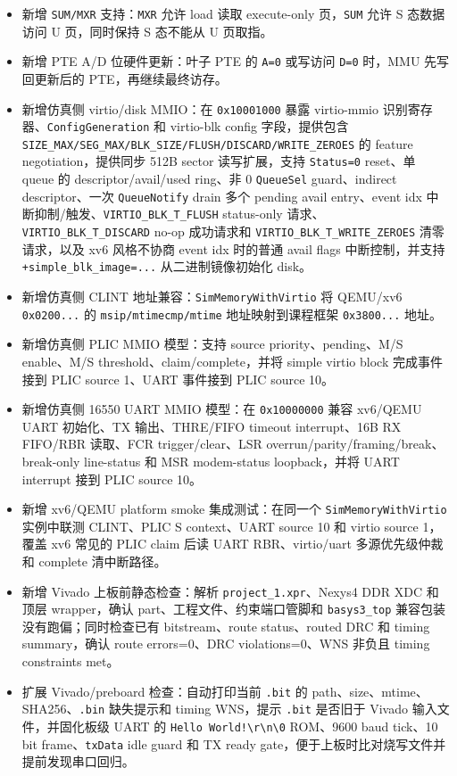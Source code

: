\documentclass[UTF8,a4paper,11pt]{ctexart}
\begin{document}
\begin{itemize}
  \item 新增 \texttt{SUM/MXR} 支持：\texttt{MXR} 允许 load 读取 execute-only 页，\texttt{SUM} 允许 S 态数据访问 U 页，同时保持 S 态不能从 U 页取指。
  \item 新增 PTE A/D 位硬件更新：叶子 PTE 的 \texttt{A=0} 或写访问 \texttt{D=0} 时，MMU 先写回更新后的 PTE，再继续最终访存。
  \item 新增仿真侧 virtio/disk MMIO：在 \texttt{0x10001000} 暴露 virtio-mmio 识别寄存器、\texttt{ConfigGeneration} 和 virtio-blk config 字段，提供包含 \texttt{SIZE\_MAX/SEG\_MAX/BLK\_SIZE/FLUSH/DISCARD/WRITE\_ZEROES} 的 feature negotiation，提供同步 512B sector 读写扩展，支持 \texttt{Status=0} reset、单 queue 的 descriptor/avail/used ring、非 0 \texttt{QueueSel} guard、indirect descriptor、一次 \texttt{QueueNotify} drain 多个 pending avail entry、event idx 中断抑制/触发、\texttt{VIRTIO\_BLK\_T\_FLUSH} status-only 请求、\texttt{VIRTIO\_BLK\_T\_DISCARD} no-op 成功请求和 \texttt{VIRTIO\_BLK\_T\_WRITE\_ZEROES} 清零请求，以及 xv6 风格不协商 event idx 时的普通 avail flags 中断控制，并支持 \texttt{+simple\_blk\_image=...} 从二进制镜像初始化 disk。
  \item 新增仿真侧 CLINT 地址兼容：\texttt{SimMemoryWithVirtio} 将 QEMU/xv6 \texttt{0x0200...} 的 \texttt{msip/mtimecmp/mtime} 地址映射到课程框架 \texttt{0x3800...} 地址。
  \item 新增仿真侧 PLIC MMIO 模型：支持 source priority、pending、M/S enable、M/S threshold、claim/complete，并将 simple virtio block 完成事件接到 PLIC source 1、UART 事件接到 PLIC source 10。
  \item 新增仿真侧 16550 UART MMIO 模型：在 \texttt{0x10000000} 兼容 xv6/QEMU UART 初始化、TX 输出、THRE/FIFO timeout interrupt、16B RX FIFO/RBR 读取、FCR trigger/clear、LSR overrun/parity/framing/break、break-only line-status 和 MSR modem-status loopback，并将 UART interrupt 接到 PLIC source 10。
  \item 新增 xv6/QEMU platform smoke 集成测试：在同一个 \texttt{SimMemoryWithVirtio} 实例中联测 CLINT、PLIC S context、UART source 10 和 virtio source 1，覆盖 xv6 常见的 PLIC claim 后读 UART RBR、virtio/uart 多源优先级仲裁和 complete 清中断路径。
  \item 新增 Vivado 上板前静态检查：解析 \texttt{project\_1.xpr}、Nexys4 DDR XDC 和顶层 wrapper，确认 part、工程文件、约束端口管脚和 \texttt{basys3\_top} 兼容包装没有跑偏；同时检查已有 bitstream、route status、routed DRC 和 timing summary，确认 route errors=0、DRC violations=0、WNS 非负且 timing constraints met。
  \item 扩展 Vivado/preboard 检查：自动打印当前 \texttt{.bit} 的 path、size、mtime、SHA256、\texttt{.bin} 缺失提示和 timing WNS，提示 \texttt{.bit} 是否旧于 Vivado 输入文件，并固化板级 UART 的 \texttt{Hello World!\textbackslash r\textbackslash n\textbackslash 0} ROM、9600 baud tick、10 bit frame、\texttt{txData} idle guard 和 TX ready gate，便于上板时比对烧写文件并提前发现串口回归。

\end{itemize}
\end{document}

